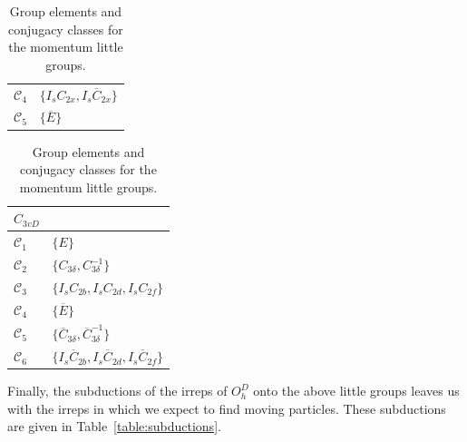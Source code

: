 \begin{table}
\begin{subtable}[t]{0.32\linewidth}
\begin{tabular}[t]{|l|l|}
                $\mathcal{C}_{4}$ & $\{I_{s} C_{2 x}, I_{s} \overline{C}_{2  x}\}$ \\
                $\mathcal{C}_{5}$ & $\{\overline{E}\}$\\
                \hline
            \end{tabular}
            \caption{}
            \label{table:C2vD}
        \end{subtable}
        \begin{subtable}[t]{0.32\linewidth}
            \centering
            \begin{tabular}[t]{|l|l|}
                \hline
                $C_{3vD}$ & \\
                \hline
                $\mathcal{C}_{1}$ & $\{E\}$ \\
                $\mathcal{C}_{2}$ & $\{C_{3 \delta}, C_{3 \delta}^{-1}\}$ \\
                $\mathcal{C}_{3}$ & $\{I_{s} C_{2 b}, I_{s} C_{2 d}, I_{s} C_{2 f}\}$ \\
                $\mathcal{C}_{4}$ & $\{\overline{E}\}$ \\
                $\mathcal{C}_{5}$ & $\{\overline{C}_{3 \delta}, \overline{C}_{3 \delta}^{-1}\}$ \\
                $\mathcal{C}_{6}$ & $\{I_{s} \overline{C}_{2 b}, I_{s} \overline{C}_{2 d}, I_{s} \overline{C}_{2 f}\}$\\
                \hline
            \end{tabular}
            \caption{}
            \label{table:C3vD}
        \end{subtable}
        \caption{Group elements and conjugacy classes for the momentum little groups.}
    \end{table}
    Finally, the subductions of the irreps of $O_h^D$ onto the above little groups leaves us with the irreps in which we expect to find moving particles. These subductions are given in Table~\ref{table:subductions}.

